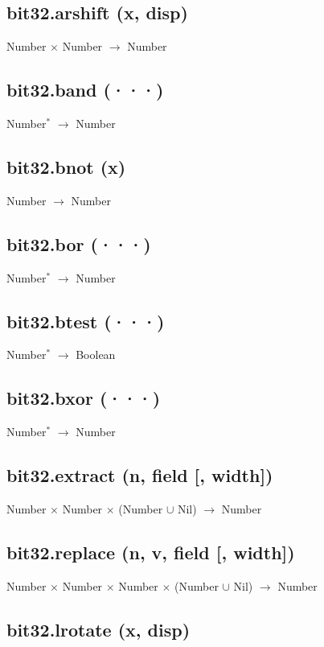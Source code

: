 \documentclass[12pt]{article}
\begin{document}
\subsection{bit32.arshift (x, disp)}

Number $\times$ Number $\rightarrow$ Number

\subsection{bit32.band (···)}

Number$^*$ $\rightarrow$ Number

\subsection{bit32.bnot (x)}

Number $\rightarrow$ Number

\subsection{bit32.bor (···)}

Number$^*$ $\rightarrow$ Number

\subsection{bit32.btest (···)}

Number$^*$ $\rightarrow$ Boolean

\subsection{bit32.bxor (···)}

Number$^*$ $\rightarrow$ Number

\subsection{bit32.extract (n, field [, width])}

Number $\times$ Number $\times$
(Number $\cup$ Nil) $\rightarrow$
Number

\subsection{bit32.replace (n, v, field [, width])}

Number $\times$ Number $\times$ Number $\times$
(Number $\cup$ Nil) $\rightarrow$
Number

\subsection{bit32.lrotate (x, disp)}
\end{document}
